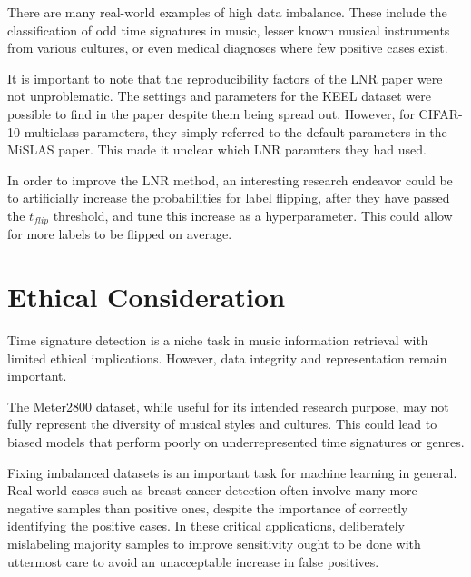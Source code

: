 \documentclass{article}
\begin{document}
There are many real-world examples of high data imbalance. These include the classification of odd time signatures in music, lesser known musical instruments from various cultures, or even medical diagnoses where few positive cases exist.

It is important to note that the reproducibility factors of the LNR paper were not unproblematic. The settings and parameters for the KEEL dataset were possible to find in the paper despite them being spread out. However, for CIFAR-10 multiclass parameters, they simply referred to the default parameters in the MiSLAS\cite{mislas_paper} paper. This made it unclear which LNR paramters they had used.

In order to improve the LNR method, an interesting research endeavor could be to artificially increase the probabilities for label flipping, after they have passed the $t_{flip}$ threshold, and tune this increase as a hyperparameter. This could allow for more labels to be flipped on average.

\section{Ethical Consideration}

Time signature detection is a niche task in music information retrieval with limited ethical implications. However, data integrity and representation remain important.

The Meter2800 dataset, while useful for its intended research purpose, may not fully represent the diversity of musical styles and cultures. This could lead to biased models that perform poorly on underrepresented time signatures or genres.

Fixing imbalanced datasets is an important task for machine learning in general. Real-world cases such as breast cancer detection often involve many more negative samples than positive ones, despite the importance of correctly identifying the positive cases. In these critical applications, deliberately mislabeling majority samples to improve sensitivity ought to be done with uttermost care to avoid an unacceptable increase in false positives.
\end{document}
